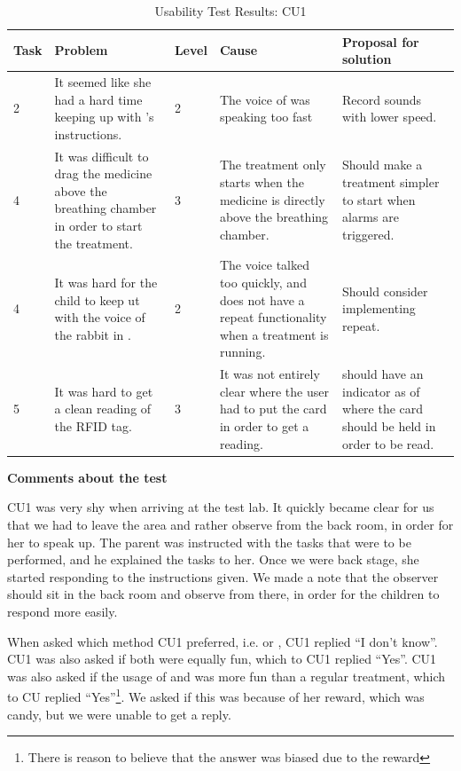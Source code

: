 \begin{table}[H]
\centering
\begin{tabular}{| p{1.0cm} | p{4.0cm} | p{0.9cm} | p{3.6cm} | p{3.1cm} |}
\hline
	\textbf{Task} & \textbf{Problem} & \textbf{Level} & \textbf{Cause} & \textbf{Proposal for solution} \\
	\hline
	2 & It seemed like she had a hard time keeping up with \ab{}'s instructions. & 2 & The voice of \ab{} was speaking too fast & Record sounds with lower speed. \\
	\hline
	4 & It was difficult to drag the medicine above the breathing chamber in order to start the treatment. & 3 & The treatment only starts when the medicine is directly above the breathing chamber. & Should make a treatment simpler to start when alarms are triggered.  \\
	\hline
	4 & It was hard for the child to keep ut with the voice of the rabbit in \app{}. & 2 & The voice talked too quickly, and \app{} does not have a repeat functionality when a treatment is running. & Should consider implementing repeat.\\ 
	\hline
	5 & It was hard to get a clean reading of the RFID tag. & 3 & It was not entirely clear where the user had to put the card in order to get a reading. & \ab{} should have an indicator as of where the card should be held in order to be read.  \\
	\hline
\end{tabular}
\caption{Usability Test Results: CU1}
\label{tab:testchild1}
\end{table}

\textbf{Comments about the test}

CU1 was very shy when arriving at the test lab. It quickly became clear for us that we had to leave the area and rather observe from the back room, in order for her to speak up. The parent was instructed with the tasks that were to be performed, and he explained the tasks to her. Once we were back stage, she started responding to the instructions given. We made a note that the observer should sit in the back room and observe from there, in order for the children to respond more easily.   

When asked which method CU1 preferred, i.e. \app{} or \ab{}, CU1 replied ``I don't know''. CU1 was also asked if both were equally fun, which to CU1 replied ``Yes''. CU1 was also asked if the usage of \app{} and \ab{} was more fun than a regular treatment, which to CU replied ``Yes''\footnote{There is reason to believe that the answer was biased due to the reward}. We asked if this was because of her reward, which was candy, but we were unable to get a reply. 

